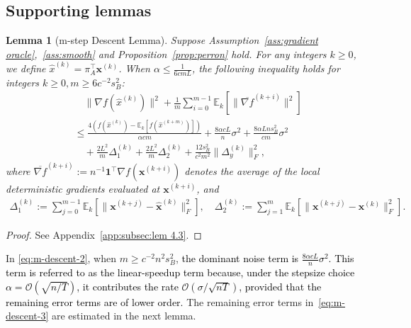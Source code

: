 \documentclass[10pt]{article}
\newcommand{\vx}{{\mathbf{x}}}
\newcommand{\EE}{\mathbb{E}}
\newcommand{\norm}[1]{\| #1 \|}
\newcommand{\revision}[1]{\textcolor{black}{#1}}
\newtheorem{lemma}[thm]{Lemma}
\begin{document}
\subsection{Supporting lemmas}
\begin{lemma}[\sc \small m-step Descent Lemma]\label{lem:m-descent}
Suppose Assumption~\ref{ass:gradient oracle},~\ref{ass:smooth} and Proposition~\ref{prop:perron} hold. For any integers $k\ge 0$, we define $\hat{x}^{(k)}=\pi_A^\top \vx^{(k)}$. When $\alpha \le \frac{1}{6cmL}$, the following inequality holds for integers $k\ge 0, m\ge 6c^{-2}s_B^2$: 
    \begin{align}\label{eq:m-descent}
        &\quad\norm{\nabla f(\hat{x}^{(k)})}^2+\frac{1}{m}\sum_{i=0}^{m-1}\EE_k[\norm{\overline{\nabla f}^{(k+i)}}^2]\\
    &\le \frac{4(f(\hat{x}^{(k)})-\EE_k[f(\hat{x}^{(k+m)})])}{\alpha c m}+\frac{8\alpha c L}{n}\sigma^2+\frac{8\alpha Lns_B^2}{cm}\sigma^2\label{eq:m-descent-2}\\
    &\quad+\frac{2 L^2}{m}\Delta_1^{(k)}+\frac{2 L^2}{m}\Delta_2^{(k)}+\frac{12 s_B^2}{c^2m^2}\norm{\Delta_y^{(k)}}_F^2,\label{eq:m-descent-3}
    \end{align}
    where $\overline{\nabla f}^{(k+i)} := n^{-1}\mathbf{1}^\top \nabla f(\vx^{(k+i)})$ denotes the average of the local deterministic gradients evaluated at $\vx^{(k+i)}$, and  
    \begin{align*}
        \Delta_1^{(k)}:=\sum_{j=0}^{m-1}\EE_k[\|\vx^{(k+j)} - \hat{\vx}^{(k)}\|_F^2], 
        \quad
        \Delta_2^{(k)}:= \sum_{j=1}^{m}\EE_k[\|\vx^{(k+j)} - \vx^{(k)}\|_F^2].
    \end{align*}
\end{lemma}
\begin{proof}
    See Appendix~\ref{app:subsec:lem 4.3}.
\end{proof}

In \eqref{eq:m-descent-2}, when $m \ge c^{-2} n^{2} s_{B}^{2}$, \revision{the dominant noise term is $\tfrac{8 \alpha c L}{n} \sigma^{2}$. This term is referred to as the linear-speedup term because, under the stepsize choice \(\alpha=\mathcal{O}(\sqrt{n/T})\), it contributes the rate \(\mathcal{O}(\sigma/\sqrt{nT})\), provided that the remaining error terms are of lower order.}  The remaining error terms in~\eqref{eq:m-descent-3} are estimated in the next lemma.
\end{document}
